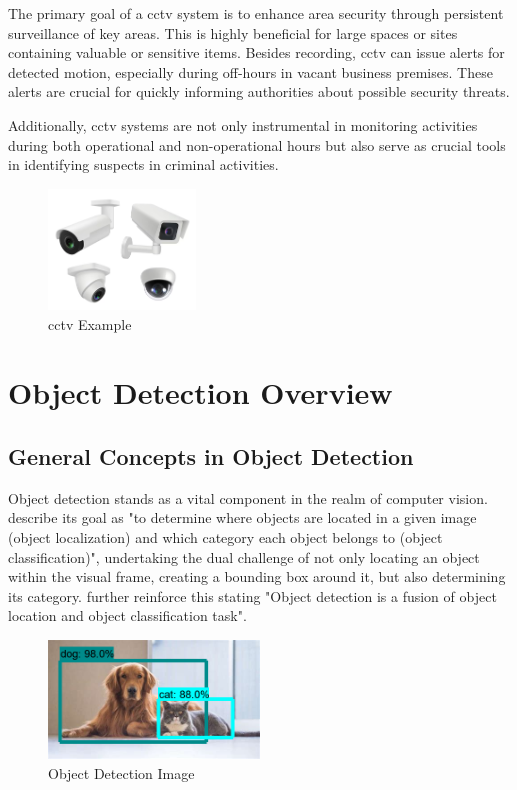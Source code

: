 The primary goal of a \ac{cctv} system is to enhance area security through persistent surveillance of key areas. This is highly beneficial for large spaces or sites containing valuable or sensitive items. Besides recording, \ac{cctv} can issue alerts for detected motion, especially during off-hours in vacant business premises. These alerts are crucial for quickly informing authorities about possible security threats.

Additionally, \ac{cctv} systems are not only instrumental in monitoring activities during both operational and non-operational hours but also serve as crucial tools in identifying suspects in criminal activities.

\begin{figure}[h]
    \centering 
    \includegraphics[width=0.35\textwidth]{figs/cctv.png} 
    \caption{\ac{cctv} Example}
    \label{fig:cctv}
\end{figure}

\section{Object Detection Overview}
\subsection{General Concepts in Object Detection}
Object detection stands as a vital component in the realm of computer vision. \citet{rfc2} describe its goal as "to determine where objects are located in a given image (object localization) and which category each object belongs to (object classification)", undertaking the dual challenge of not only locating an object within the visual frame, creating a bounding box around it, but also determining its category. \citet{rfc9} further reinforce this stating "Object detection is a fusion of object location and object classification task".

\begin{figure}[h]
    \centering 
    \includegraphics[width=0.5\textwidth]{figs/object-detection.png} 
    \caption{Object Detection Image ~\cite{rfc15}}
    \label{fig:object-detection}
\end{figure}

